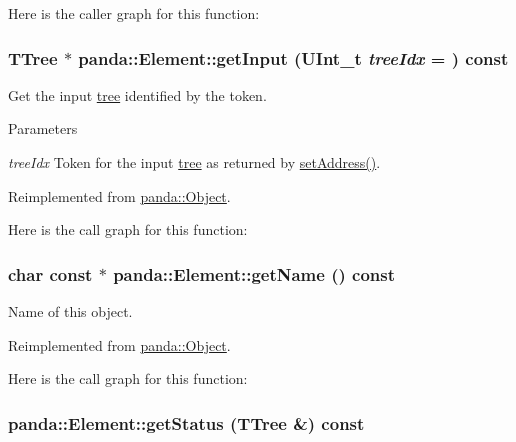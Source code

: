 Here is the caller graph for this function:\hypertarget{classpanda_1_1Element_a015e9911602ca22405225d0584c39de3}{
\subsubsection[{getInput}]{\setlength{\rightskip}{0pt plus 5cm}TTree $\ast$ panda::Element::getInput (UInt\_\-t {\em treeIdx} = {}) const}}
\label{classpanda_1_1Element_a015e9911602ca22405225d0584c39de3}


Get the input \hyperlink{namespacepanda_1_1tree}{tree} identified by the token. 
\begin{DoxyParams}{Parameters}
\item[{\em treeIdx}]Token for the input \hyperlink{namespacepanda_1_1tree}{tree} as returned by \hyperlink{classpanda_1_1Element_a0f4c9e587ee4c4ccbc27b76b06adbc80}{setAddress()}. \end{DoxyParams}


Reimplemented from \hyperlink{classpanda_1_1Object_a69038e1ce9bc60222bb0ba7e7f933bd5}{panda::Object}.

Here is the call graph for this function:\hypertarget{classpanda_1_1Element_a258c5be022395f98b13120cdab80fb51}{
\subsubsection[{getName}]{\setlength{\rightskip}{0pt plus 5cm}char const $\ast$ panda::Element::getName () const}}
\label{classpanda_1_1Element_a258c5be022395f98b13120cdab80fb51}


Name of this object. 

Reimplemented from \hyperlink{classpanda_1_1Object_a670b2150de796b6fc742fa9de30cd6b1}{panda::Object}.

Here is the call graph for this function:\hypertarget{classpanda_1_1Element_acab0938ba6e630b042052a960b58546e}{
\subsubsection[{getStatus}]{ panda::Element::getStatus (TTree \&) const}}
\label{classpanda_1_1Element_acab0938ba6e630b042052a960b58546e}


